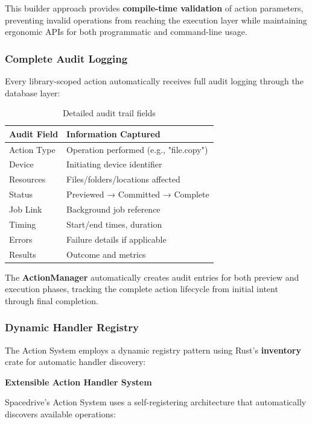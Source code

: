 \documentclass[sigconf]{acmart}
\begin{document}
This builder approach provides \textbf{compile-time validation} of action parameters, preventing invalid operations from reaching the execution layer while maintaining ergonomic APIs for both programmatic and command-line usage.

\subsubsection{Complete Audit Logging}

Every library-scoped action automatically receives full audit logging through the database layer:

\begin{table}[h]
\footnotesize
\centering
\begin{tabular}{@{}ll@{}}
\toprule
\textbf{Audit Field} & \textbf{Information Captured} \\
\midrule
Action Type & Operation performed (e.g., "file.copy") \\
Device & Initiating device identifier \\
Resources & Files/folders/locations affected \\
Status & Previewed → Committed → Complete \\
Job Link & Background job reference \\
Timing & Start/end times, duration \\
Errors & Failure details if applicable \\
Results & Outcome and metrics \\
\bottomrule
\end{tabular}
\caption{Detailed audit trail fields}
\label{tab:audit-fields}
\end{table}

The \textbf{ActionManager} automatically creates audit entries for both preview and execution phases, tracking the complete action lifecycle from initial intent through final completion.

\subsubsection{Dynamic Handler Registry}

The Action System employs a dynamic registry pattern using Rust's \textbf{inventory} crate for automatic handler discovery:

\textbf{Extensible Action Handler System}

Spacedrive's Action System uses a self-registering architecture that automatically discovers available operations:
\end{document}
